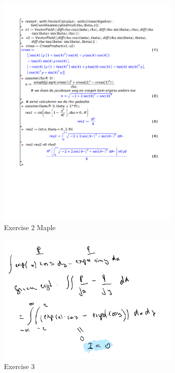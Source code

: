 \documentclass[a4paper]{report}
\begin{document}
\begin{figure}[H]
	\centering
	\includegraphics[width=0.8\textwidth]{exercises/huis_7_ex_2.pdf}
	\caption{Exercise 2 Maple}
\end{figure}

\begin{figure}[H]
	\centering
	\includegraphics[width=0.8\textwidth]{assets/huis_7_ex_3.png}
	\caption{Exercise 3}
	\label{fig:huis_7_ex_3}
\end{figure}
\end{document}
